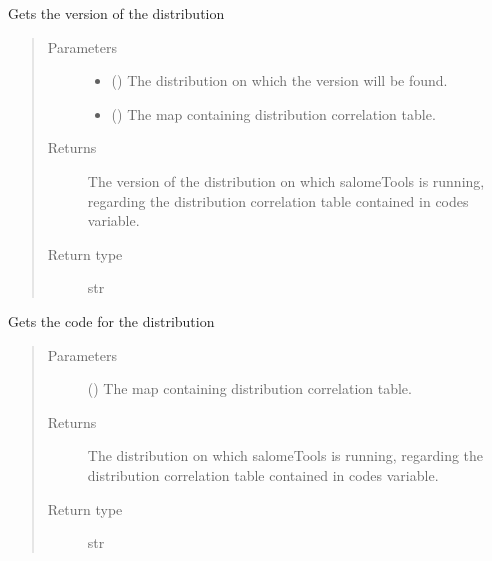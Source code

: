 \documentclass[a4paper,10pt,english]{sphinxmanual}
\begin{document}
\begin{fulllineitems}
\label{\detokenize{commands/apidoc/src:src.architecture.get_distrib_version}}
Gets the version of the distribution
\begin{quote}\begin{description}
\item[{Parameters}] \leavevmode\begin{itemize}
\item {} 
 () \textendash{} The distribution on which the version will be found.

\item {} 
 () \textendash{} The map containing distribution correlation table.

\end{itemize}

\item[{Returns}] \leavevmode
The version of the distribution on which salomeTools is running, 
regarding the distribution correlation table contained in codes 
variable.

\item[{Return type}] \leavevmode
str

\end{description}\end{quote}

\end{fulllineitems}


\begin{fulllineitems}
\label{\detokenize{commands/apidoc/src:src.architecture.get_distribution}}
Gets the code for the distribution
\begin{quote}\begin{description}
\item[{Parameters}] \leavevmode
{} () \textendash{} The map containing distribution correlation table.

\item[{Returns}] \leavevmode
The distribution on which salomeTools is running, regarding the 
distribution correlation table contained in codes variable.

\item[{Return type}] \leavevmode
str

\end{description}\end{quote}

\end{fulllineitems}
\end{document}
